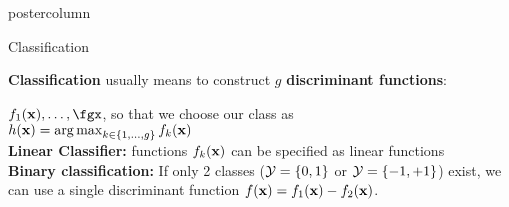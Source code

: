 \documentclass{beamer}
\begin{document}
\begin{frame}[fragile]{}
\begin{columns}
\begin{column}{.31\textwidth}
\begin{beamercolorbox}[center]{postercolumn}
\begin{minipage}{.98\textwidth}
{\begin{myblock}{Classification}
%             


\textbf{Classification} usually means to construct $g$ \textbf{discriminant functions}:
  
$f_1(\xv), \ldots, \fgx$, so that we choose our class as \\ $h(\mathbf{x}) = \operatorname{arg\,max}_{k \in \{1, \ldots, g\}} f_{k}(\mathbf{x})$ \\

\textbf{Linear Classifier:} functions $f_{k}(\mathbf{x})$ can be specified as linear functions\\


\textbf{Binary classification: }If only 2 classes ($\mathcal{Y} = \{0, 1\}$ or  $\mathcal{Y} = \{-1, +1\}$) exist, we can use a single discriminant function $f(\mathbf{x}) = f_{1}(\mathbf{x}) - f_{2}(\mathbf{x})$.  \\


% 


\end{myblock}
			  }
			\end{minipage}
		\end{beamercolorbox}
	\end{column}
\end{columns}

\end{frame}
\end{document}
